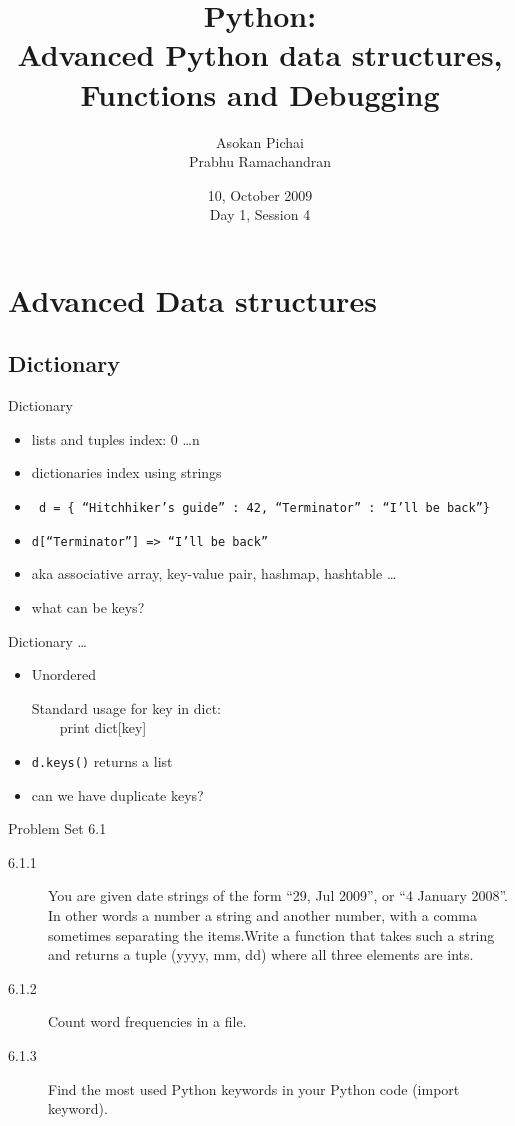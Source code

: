 \documentclass[14pt,compress]{beamer}
\title[Basic Python]{Python:\\Advanced Python data structures, Functions and Debugging}
\author[FOSSEE Team] {Asokan Pichai\\Prabhu Ramachandran}
\institute[IIT Bombay] {Department of Aerospace Engineering\\IIT Bombay}
\date[] {10, October 2009\\Day 1, Session 4}
\newcounter{time}
\newcommand{\inctime}[1]{\addtocounter{time}{#1}{\tiny \thetime\ m}}
\newcommand{\typ}[1]{\texttt{#1}}
\begin{document}
\begin{frame}
  \titlepage
\end{frame}

\section{Advanced Data structures}

\subsection{Dictionary}
\begin{frame}{Dictionary}
  \begin{itemize}
    \item lists and tuples index: 0 \ldots n
    \item dictionaries index using strings
    \item \typ{ d = \{ ``Hitchhiker's guide'' : 42, ``Terminator'' : ``I'll be back''\}}
    \item \typ{d[``Terminator''] => ``I'll be back''}
    \item aka associative array, key-value pair, hashmap, hashtable \ldots    
    \item what can be keys?
  \end{itemize}
\end{frame}

\begin{frame}{Dictionary \ldots }
  \begin{itemize}
    \item \alert{Unordered}
      \begin{block}{Standard usage}
        for key in dict:\\
        \ \ \ \ print dict[key]
      \end{block}
    \item \typ{d.keys()} returns a list
    \item can we have duplicate keys?
  \end{itemize}
  \inctime{5}
\end{frame}

\begin{frame} {Problem Set 6.1}
  \begin{description}
\item[6.1.1] You are given date strings of the form ``29, Jul 2009'', or ``4 January 2008''. In other words a number a string and another number, with a comma sometimes separating the items.Write a function that takes such a string and returns a tuple (yyyy, mm, dd) where all three elements are ints.
    \item[6.1.2] Count word frequencies in a file.
    \item[6.1.3] Find the most used Python keywords in your Python code (import keyword).
\end{description}

\inctime{10}
\end{frame}
\end{document}
